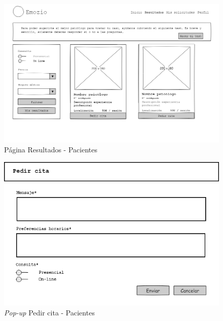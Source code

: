 \begin{figure}[htbp] 
    \centering
    \includegraphics[width=1\textwidth]{figuras/mockup_pacientes/mis_resultados.png}
    \caption{Página Resultados - Pacientes}
\end{figure}	

\begin{figure}[htbp] 
    \centering
    \includegraphics[width=1\textwidth]{figuras/mockup_pacientes/pedir_cita.png}
    \caption{\textit{Pop-up} Pedir cita - Pacientes}
\end{figure}	

